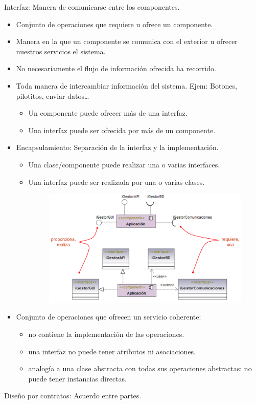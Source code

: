 \documentclass[12pt, twoside, openright]{report} %
\begin{document}
\pagebreak
Interfaz: Manera de comunicarse entre los componentes.
\begin{itemize}
	\item Conjunto de operaciones que requiere u ofrece un componente.
	\item Manera en la que un componente se comunica con el exterior u
		ofrecer nuestros servicios el sistema.
	\item No necesariamente el flujo de información ofrecida ha recorrido.
	\item Toda manera de intercambiar información del sistema. Ejem:
		Botones, pilotitos, enviar datos\ldots{}
		\begin{itemize}
			\item Un componente puede ofrecer más de una interfaz.
			\item Una interfaz puede ser ofrecida por más de un componente.
		\end{itemize}
	\item Encapsulamiento: Separación de la interfaz y la implementación.
		\begin{itemize}
			\item Una clase/componente puede realizar una o varias interfaces.
			\item Una interfaz puede ser realizada por una o varias clases.
			\begin{figure}[H]
				{\includegraphics[scale=.3]{Untitled 43.png}}
			\end{figure}
		\end{itemize}
	\item Conjunto de operaciones que ofrecen un servicio coherente:
		\begin{itemize}
			\item no contiene la implementación de las operaciones.
			\item una interfaz no puede tener atributos ni asociaciones.
			\item analogía a una clase abstracta con todas sus operaciones
			abstractas: no puede tener instancias directas.
		\end{itemize}
\end{itemize}
\pagebreak
	Diseño por contratos: Acuerdo entre partes.
\end{document}
